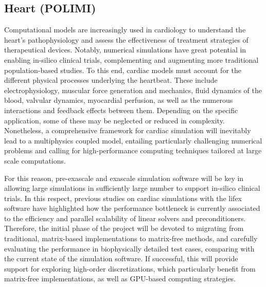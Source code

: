 \documentclass[a4paper,12pt]{article}
\begin{document}
\subsection{Heart (POLIMI)}
Computational models are increasingly used in cardiology to understand the heart's pathophysiology and assess the effectiveness of treatment strategies of therapeutical devices.
Notably, numerical simulations have great potential in enabling in-silico clinical trials, complementing and augmenting more traditional population-based studies.
To this end, cardiac models must account for the different physical processes underlying the heartbeat.
These include electrophysiology, muscular force generation and mechanics, fluid dynamics of the blood, valvular dynamics, myocardial perfusion, as well as the numerous interactions and feedback effects between them.
Depending on the specific application, some of these may be neglected or reduced in complexity.
Nonetheless, a comprehensive framework for cardiac simulation will inevitably lead to a multiphysics coupled model, entailing particularly challenging numerical problems and calling for high-performance computing techniques tailored at large scale computations.

For this reason, pre-exascale and exascale simulation software will be key in allowing large simulations in sufficiently large number to support in-silico clinical trials.
In this respect, previous studies on cardiac simulations with the lifex software have highlighted how the performance bottleneck is currently associated to the efficiency and parallel scalability of linear solvers and preconditioners.
Therefore, the initial phase of the project will be devoted to migrating from traditional, matrix-based implementations to matrix-free methods, and carefully evaluating the performance in biophysically detailed test cases, comparing with the current state of the simulation software.
If successful, this will provide support for exploring high-order discretizations, which particularly benefit from matrix-free implementations, as well as GPU-based computing strategies.
\end{document}

